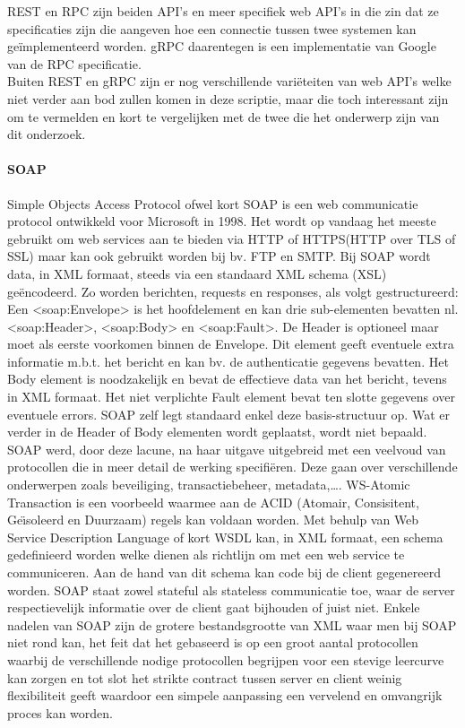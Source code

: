 REST en RPC zijn beiden API's en meer specifiek web API's in die zin dat ze specificaties zijn die aangeven hoe een connectie tussen twee systemen kan geïmplementeerd worden.
gRPC daarentegen is een implementatie van Google van de RPC specificatie.\\

Buiten REST en gRPC zijn er nog verschillende vari\"eteiten van web API's welke niet verder aan bod zullen komen in deze scriptie, maar die toch interessant zijn om
te vermelden en kort te vergelijken met de twee die het onderwerp zijn van dit onderzoek.


\paragraph{SOAP}
Simple Objects Access Protocol ofwel kort SOAP is een web communicatie protocol ontwikkeld voor Microsoft in 1998. Het wordt op vandaag het meeste gebruikt om
web services aan te bieden via HTTP of HTTPS(HTTP over TLS of SSL) maar kan ook gebruikt worden bij bv. FTP en SMTP.\newline
Bij SOAP wordt data, in XML formaat, steeds via een standaard XML schema (XSL) ge\"encodeerd. Zo worden berichten, requests en responses, als volgt gestructureerd:
Een <soap:Envelope> is het hoofdelement en kan drie sub-elementen bevatten nl. <soap:Header>, <soap:Body> en <soap:Fault>. De Header is optioneel maar moet
als eerste voorkomen binnen de Envelope. Dit element geeft eventuele extra informatie m.b.t. het bericht en kan bv. de authenticatie gegevens bevatten. Het Body element
is noodzakelijk en bevat de effectieve data van het bericht, tevens in XML formaat. Het niet verplichte Fault element bevat ten slotte gegevens over eventuele errors.\newline
SOAP zelf legt standaard enkel deze basis-structuur op. Wat er verder in de Header of Body elementen wordt geplaatst, wordt niet bepaald. SOAP werd, door deze lacune, na haar
uitgave uitgebreid met een veelvoud van protocollen die in meer detail de werking specifi\"eren. Deze gaan over verschillende onderwerpen zoals beveiliging, transactiebeheer,
metadata,\ldots. WS-Atomic Transaction is een voorbeeld waarmee aan de ACID (Atomair, Consisitent, Ge\"{\i}soleerd en Duurzaam) regels kan voldaan worden.
Met behulp van Web Service Description Language of kort WSDL kan, in XML formaat, een schema gedefinieerd worden welke dienen als richtlijn om met een web service te
communiceren. Aan de hand van dit schema kan code bij de client gegenereerd worden. SOAP staat zowel stateful als stateless communicatie toe, waar de server respectievelijk
informatie over de client gaat bijhouden of juist niet.\newline
Enkele nadelen van SOAP zijn de grotere bestandsgrootte van XML waar men bij SOAP niet rond kan, het feit dat het gebaseerd is op een groot aantal protocollen waarbij
de verschillende nodige protocollen begrijpen voor een stevige leercurve kan zorgen en tot slot het strikte contract tussen server en client weinig flexibiliteit geeft
waardoor een simpele aanpassing een vervelend en omvangrijk proces kan worden.\newline
~\autocite{soap,redhatapissoaprestgraphqlgrpc}\\

